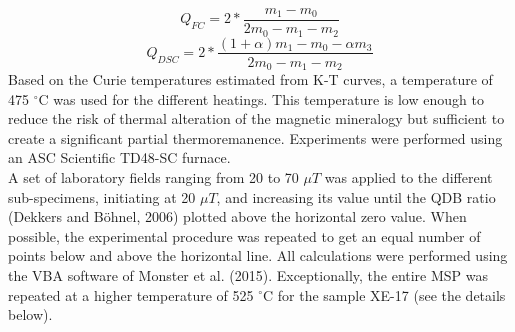 \documentclass[review]{elsarticle}
\begin{document}
$$
Q_{FC}=2*\frac{m_1-m_0}{2m_0-m_1-m_2}
$$
$$
Q_{DSC}=2*\frac{(1+\alpha)m_1-m_0-\alpha m_3}{2m_0-m_1-m_2}
$$
Based on the Curie temperatures estimated from K-T curves, a temperature of 475 $^{\circ}$C was used for the different heatings. This temperature is low enough to reduce the risk of thermal alteration of the magnetic mineralogy but sufficient to create a significant partial thermoremanence. Experiments were performed using an ASC Scientific TD48-SC furnace.
\\
A set of laboratory fields ranging from 20 to 70 $\mu T$ was applied to the
different sub-specimens, initiating at 20 $\mu T$, and increasing its value
until the QDB ratio (Dekkers and B{\"o}hnel, 2006) plotted above the horizontal zero value. When possible, the experimental procedure was repeated to get an equal number of points below and above the horizontal line. All calculations were performed using the VBA software of Monster et al. (2015). Exceptionally, the entire MSP was repeated at a higher temperature of 525 $^{\circ}$C for the sample XE-17 (see the details below).
\end{document}
